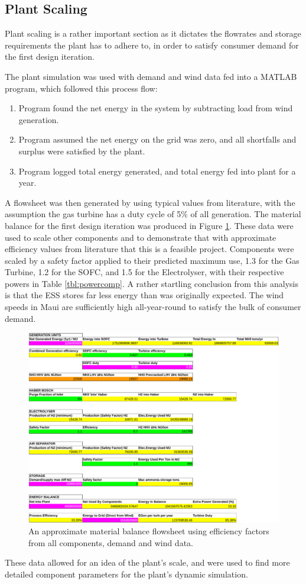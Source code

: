 \subsection{Plant Scaling}
\label{sec:plantscale}

Plant scaling is a rather important section as it dictates the flowrates and storage requirements the plant has to adhere to, in order to satisfy consumer demand for the first design iteration.

The plant simulation was used with demand and wind data fed into a MATLAB program, which followed this process flow:
\begin{enumerate}
    \item Program found the net energy in the system by subtracting load from wind generation.
    \item Program assumed the net energy on the grid was zero, and all shortfalls and surplus were satisfied by the plant.
    \item Program logged total energy generated, and total energy fed into plant for a year.
\end{enumerate}

A flowsheet was then generated by using typical values from literature, with the assumption the gas turbine has a duty cycle of 5\% of all generation.
The material balance for the first design iteration was produced in Figure \ref{flowsheettbl}.
These data were used to scale other components and to demonstrate that with approximate efficiency values from literature that this is a feasible project.
Components were scaled by a safety factor applied to their predicted maximum use, 1.3 for the Gas Turbine, 1.2 for the SOFC, and 1.5 for the Electrolyser, with their respective powers in Table \ref{tbl:powercomp}.
A rather startling conclusion from this analysis is that the ESS stores far less energy than was originally expected.
The wind speeds in Maui are sufficiently high all-year-round to satisfy the bulk of consumer demand.

\begin{figure}[tbh]
    \centering
    \includegraphics[scale=0.9]{images/flowtable.pdf}
    \caption{An approximate material balance flowsheet using efficiency factors from all components, demand and wind data.}
    \label{flowsheettbl}
\end{figure}

These data allowed for an idea of the plant's scale, and were used to find more detailed component parameters for the plant's dynamic simulation. 